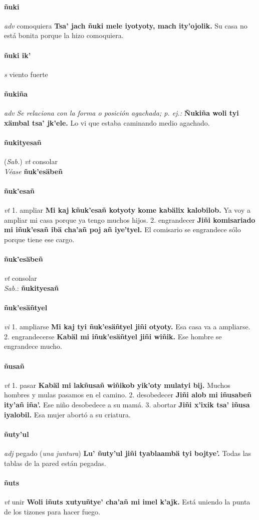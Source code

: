 \documentclass{scrbook}
\newcommand{\entry}[1]{\paragraph{#1}}
\newcommand{\onedefinition}[1]{#1.}
\newcommand{\nontranslationdef}[1]{\textit{#1}}
\newcommand{\partofspeech}[1]{\textit{#1}}
\newcommand{\spanishtranslation}[1]{#1}
\newcommand{\clarification}[1]{(\textit{#1})}
\newcommand{\cholexample}[1]{\textbf{#1}}
\newcommand{\exampletranslation}[1]{#1}
\newcommand{\dialectvariant}[1]{\\\textit{#1}:}
\newcommand{\dialectword}[1]{\textbf{#1}}
\newcommand{\alsosee}[1]{\\\textit{Véase} \textbf{#1}}
\newcommand{\relevantdialect}[1]{(\textit{#1})}
\begin{document}
\begin{multicols}{2}
\entry{ñuki}
\partofspeech{adv}
\spanishtranslation{comoquiera}
\cholexample{Tsa' jach ñuki mele iyotyoty, mach ity'ojolik.}
\exampletranslation{Su casa no está bonita porque la hizo comoquiera.}

\entry{ñuki ik'}
\partofspeech{s}
\spanishtranslation{viento fuerte}

\entry{ñukiña}
\partofspeech{adv}
\nontranslationdef{Se relaciona con la forma o posición agachada; p. ej.:}
\cholexample{Ñukiña woli tyi xämbal tsa' jk'ele.}
\exampletranslation{Lo vi que estaba caminando medio agachado.}

\entry{ñukityesañ}
\relevantdialect{Sab.}
\partofspeech{vt}
\spanishtranslation{consolar}
\alsosee{ñuk'esäbeñ}

\entry{ñuk'esañ}
\partofspeech{vt}
\onedefinition{1}
\spanishtranslation{ampliar}
\cholexample{Mi kaj kñuk'esañ kotyoty kome kabälix kalobilob.}
\exampletranslation{Ya voy a ampliar mi casa porque ya tengo muchos hijos.}
\onedefinition{2}
\spanishtranslation{engrandecer}
\cholexample{Jiñi komisariado mi iñuk'esañ ibä cha'añ poj añ iye'tyel.}
\exampletranslation{El comisario se engrandece sólo porque tiene ese cargo.}

\entry{ñuk'esäbeñ}
\partofspeech{vt}
\spanishtranslation{consolar}
\dialectvariant{Sab.}
\dialectword{ñukityesañ}

\entry{ñuk'esäñtyel}
\partofspeech{vi}
\onedefinition{1}
\spanishtranslation{ampliarse}
\cholexample{Mi kaj tyi ñuk'esäñtyel jiñi otyoty.}
\exampletranslation{Esa casa va a ampliarse.}
\onedefinition{2}
\spanishtranslation{engrandecerse}
\cholexample{Kabäl mi iñuk'esäñtyel jiñi wiñik.}
\exampletranslation{Ese hombre se engrandece mucho.}

\entry{ñusañ}
\partofspeech{vt}
\onedefinition{1}
\spanishtranslation{pasar}
\cholexample{Kabäl mi lakñusañ wiñikob yik'oty mulatyi bij.}
\exampletranslation{Muchos hombres y mulas pasamos en el camino.}
\onedefinition{2}
\spanishtranslation{desobedecer}
\cholexample{Jiñi alob mi iñusabeñ ity'añ iña'.}
\exampletranslation{Ese niño desobedece a su mamá.}
\onedefinition{3}
\spanishtranslation{abortar}
\cholexample{Jiñi x'ixik tsa' iñusa iyalobil.}
\exampletranslation{Esa mujer abortó a su criatura.}

\entry{ñuty'ul}
\partofspeech{adj}
\spanishtranslation{pegado}
\clarification{una juntura}
\cholexample{Lu' ñuty'ul jiñi tyablaambä tyi bojtye'.}
\exampletranslation{Todas las tablas de la pared están pegadas.}

\entry{ñuts}
\partofspeech{vt}
\spanishtranslation{unir}
\cholexample{Woli iñuts xutyuñtye' cha'añ mi imel k'ajk.}
\exampletranslation{Está uniendo la punta de los tizones para hacer fuego.}


\end{multicols}
\end{document}
